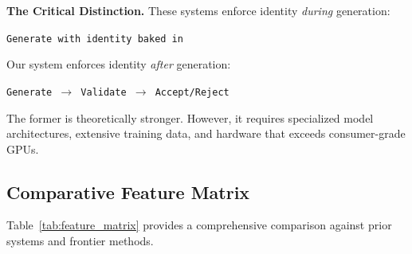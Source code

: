 \documentclass[11pt,a4paper,twocolumn]{article}
\begin{document}
\begin{insightbox}
\textbf{The Critical Distinction.} These systems enforce identity \textit{during} generation:

\begin{center}
\texttt{Generate with identity baked in}
\end{center}

\noindent Our system enforces identity \textit{after} generation:

\begin{center}
\texttt{Generate $\rightarrow$ Validate $\rightarrow$ Accept/Reject}
\end{center}

\noindent The former is theoretically stronger. However, it requires specialized model architectures, extensive training data, and hardware that exceeds consumer-grade GPUs.
\end{insightbox}

\subsection{Comparative Feature Matrix}

Table~\ref{tab:feature_matrix} provides a comprehensive comparison against prior systems and frontier methods.
\end{document}
